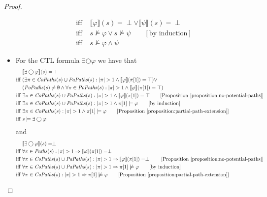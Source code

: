 \documentclass[12pt]{article}
\newcommand{\nxt}{\bigcirc}
\theoremstyle{definition}
\newcommand{\comment}[1]{\hspace{2em}[\mbox{#1}]}
\newcommand{\satisfaction}[1]{\llbracket #1 \rrbracket}
\newenvironment{franck}{\color{red}}{\color{black}}
\begin{document}
\begin{proof}
\begin{itemize}
\begin{align*}
\mbox{iff } & \satisfaction{\varphi}(s) = \perp \vee \satisfaction{\psi}(s) = \perp\\
\mbox{iff } & s \not\models \varphi \vee s \not\models \psi
\comment{by induction}\\
\mbox{iff } & s \not\models \varphi \wedge \psi
\end{align*}
\begin{franck}
\item
For the CTL formula $\exists \nxt \varphi$ we have that
\begin{align*}
& \satisfaction{\exists \nxt \varphi}(s) = \top\\
\mbox{iff } & (\exists \pi \in \mathit{CoPaths}(s) \cup \mathit{PaPaths}(s) : |\pi| > 1 \wedge \satisfaction{\varphi}(\pi[1]) = \top) \vee\\
& (\mathit{PoPaths}(s) \not= \emptyset \wedge \forall \pi \in \mathit{PoPaths}(s) : |\pi| > 1 \wedge \satisfaction{\varphi}(\pi[1]) = \top)\\
\mbox{iff } & \exists \pi \in \mathit{CoPaths}(s) \cup \mathit{PaPaths}(s) : |\pi| > 1 \wedge \satisfaction{\varphi}(\pi[1]) = \top
\comment{Proposition~\ref{proposition:no-potential-paths}}\\
\mbox{iff } & \exists \pi \in \mathit{CoPaths}(s) \cup \mathit{PaPaths}(s) : |\pi| > 1 \wedge \pi[1] \models \varphi
\comment{by induction}\\
\mbox{iff } & \exists \pi \in \mathit{CoPaths}(s) : |\pi| > 1 \wedge \pi[1] \models \varphi
\comment{Proposition~\ref{proposition:partial-path-extension}}\\
\mbox{iff } & s \models \exists \nxt \varphi
\end{align*}
and
\begin{align*}
& \satisfaction{\exists \nxt \varphi}(s) = \perp\\
\mbox{iff } & \forall \pi \in \mathit{Paths}(s) : |\pi| > 1 \Rightarrow \satisfaction{\varphi}(\pi[1]) = \perp\\
\mbox{iff } & \forall \pi \in \mathit{CoPaths}(s) \cup \mathit{PaPaths}(s) : |\pi| > 1 \Rightarrow \satisfaction{\varphi}(\pi[1]) = \perp
\comment{Proposition~\ref{proposition:no-potential-paths}}\\
\mbox{iff } & \forall \pi \in \mathit{CoPaths}(s) \cup \mathit{PaPaths}(s) : |\pi| > 1 \Rightarrow \pi[1] \not\models \varphi
\comment{by induction}\\
\mbox{iff } & \forall \pi \in \mathit{CoPaths}(s) : |\pi| > 1 \Rightarrow \pi[1] \not\models \varphi
\comment{Proposition~\ref{proposition:partial-path-extension}}\\

\end{align*}
\end{franck}
\end{itemize}
\end{proof}
\end{document}
